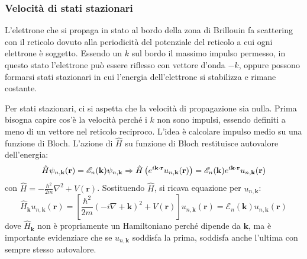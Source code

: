 \documentclass[10pt, a4paper]{scrartcl}
\numberwithin{equation}{subsection}
\theoremstyle{style1}
\theoremstyle{style2}
\begin{document}
\subsubsection{Velocit\`a di stati stazionari}

L'elettrone che si propaga in stato al bordo della zona di Brillouin fa scattering con il reticolo dovuto alla periodicit\`a  del potenziale del reticolo a cui ogni elettrone \`e soggetto. 
Essendo un $k$ sul bordo il massimo impulso permesso, in questo stato l'elettrone pu\`o essere riflesso con vettore d'onda $-k$, oppure possono formarsi stati stazionari in cui l'energia dell'elettrone si stabilizza e rimane costante.

Per stati stazionari, ci si aspetta che la velocit\`a di propagazione sia nulla. Prima bisogna capire cos'\`e la velocit\`a perch\'e i $k$ non sono impulsi, essendo definiti a meno di un vettore nel reticolo reciproco.
L'idea \`e calcolare impulso medio su una funzione di Bloch. L'azione di $\hat{H}$ su funzione di Bloch restituisce autovalore dell'energia: 
\[ 
		 \hat{H} \psi _{n,\mathbf{k} } (\mathbf{r} ) =  \mathscr{E}_n (\mathbf{k} ) \psi _{n,\mathbf{k} }\Rightarrow \hat{H} \left(e^{i \mathbf{k} \cdot \mathbf{r} }u_{n,\mathbf{k} } (\mathbf{r} ) \right)  = \mathscr{E}_n (\mathbf{k} ) e^{i\mathbf{k} \cdot \mathbf{r} } u_{n,\mathbf{k} } (\mathbf{r} ) \\ 
\] 
con $\hat{H} = -\frac{\hbar ^2}{2m}\nabla ^2 + V(\mathbf{r} )$. Sostituendo $\hat{H}$, si ricava equazione per $u_{n,\mathbf{k} } $:
\begin{equation}
	\hat{H}_\mathbf{k} u_{n,\mathbf{k} } (\mathbf{r} ) = \left[ \frac{\hbar ^2}{2m} \left(-i \nabla +\mathbf{k} \right) ^2 + V(\mathbf{r} ) \right] u_{n,\mathbf{k} } (\mathbf{r} ) = \mathscr{E}_{n} (\mathbf{k} ) u_{n,\mathbf{k} } (\mathbf{r} )
\end{equation}
dove $\hat{H}_\mathbf{k} $ non \`e propriamente un Hamiltoniano perch\'e dipende da $\mathbf{k} $, ma \`e importante evidenziare che se $u_{n,\mathbf{k} } $ soddisfa la prima, soddisfa anche l'ultima con sempre stesso autovalore.
\end{document}
